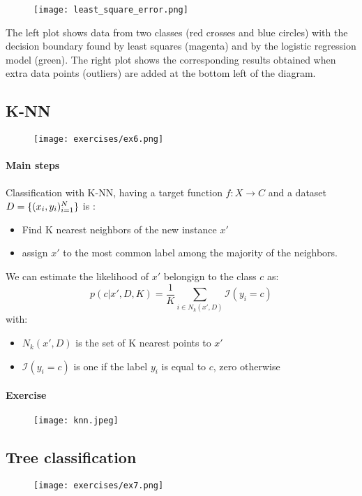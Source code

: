 \begin{figure}[H]
    \centering
    \texttt{[image: least\_square\_error.png]}
\end{figure}
The left plot shows data from two classes (red crosses and blue circles) with the decision boundary found by least squares (magenta) and by the logistic regression model (green). The right plot shows the corresponding results obtained when extra data points (outliers) are added at the bottom left of the diagram.

\subsection{K-NN}

\begin{figure}[H]
    \centering
    \texttt{[image: exercises/ex6.png]}
\end{figure}

\paragraph{Main steps}
Classification with K-NN, having a target function $f:X\rightarrow C$ and a dataset $D=\lbrace{(x_i,y_i)^N_{i=1}}\rbrace$ is :
\begin{itemize}
\item Find K nearest neighbors of the new instance $x'$
\item assign $x'$ to the most common label among the majority of the neighbors.
\end{itemize}
We can estimate the likelihood of $x'$ belongign to the class $c$ as:
\[p(c| x',D,K)=\frac{1}{K}\sum_{i \in N_k(x',D)}\mathcal{I}(y_i=c)\]
with:
\begin{itemize}
\item $ N_k(x',D)$ is the set of K nearest points to $x'$
\item $\mathcal{I}(y_i=c)$ is one if the label $y_i$ is equal to $c$, zero otherwise
\end{itemize}

\paragraph{Exercise}
\begin{figure}[H]
    \centering
    \texttt{[image: knn.jpeg]}
\end{figure}
\subsection{Tree classification}
\begin{figure}[H]
    \centering
    \texttt{[image: exercises/ex7.png]}
\end{figure}

